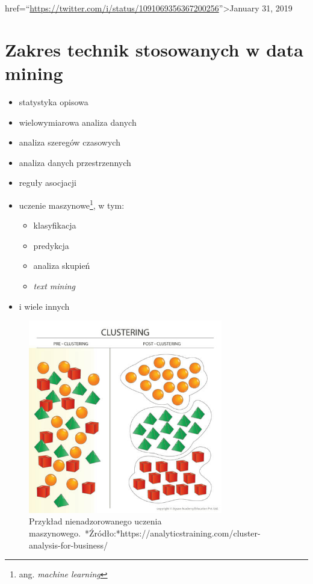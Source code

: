 \documentclass[
]{book}
\providecommand{\tightlist}{%
  \setlength{\itemsep}{0pt}\setlength{\parskip}{0pt}}
\theoremstyle{plain}
\theoremstyle{definition}
\theoremstyle{definition}
\theoremstyle{definition}
\theoremstyle{definition}
\theoremstyle{remark}
\begin{document}
href=``\url{https://twitter.com/i/status/1091069356367200256}''\textgreater January 31, 2019

\hypertarget{zakres-technik-stosowanych-w-data-mining}{%
\section*{Zakres technik stosowanych w data mining}\label{zakres-technik-stosowanych-w-data-mining}}

\begin{itemize}
\tightlist
\item
  statystyka opisowa
\item
  wielowymiarowa analiza danych
\item
  analiza szeregów czasowych
\item
  analiza danych przestrzennych
\item
  reguły asocjacji
\item
  uczenie maszynowe\footnote{ang. \emph{machine learning}}, w tym:

  \begin{itemize}
  \tightlist
  \item
    klasyfikacja
  \item
    predykcja
  \item
    analiza skupień
  \item
    \emph{text mining}
  \end{itemize}
\item
  i wiele innych
\end{itemize}

\begin{figure}
\includegraphics[width=3.33in]{images/cluster1} \caption{Przykład nienadzorowanego uczenia maszynowego.\  *Źródło:*https://analyticstraining.com/cluster-analysis-for-business/}\label{fig:cluster1}
\end{figure}
\end{document}
